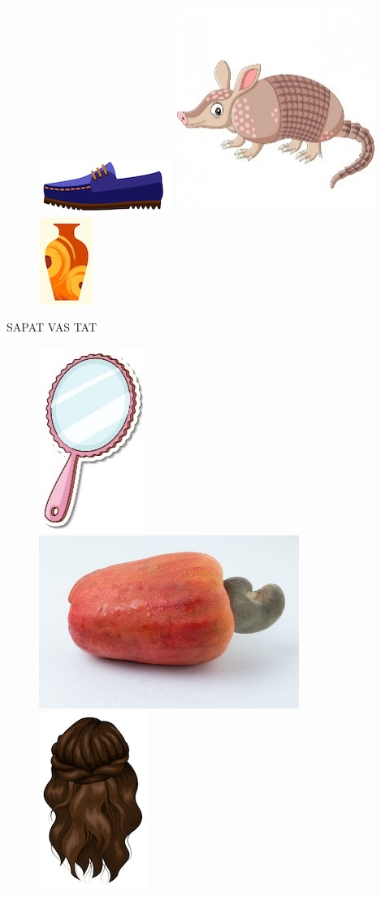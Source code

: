 \begin{figure}[htpb!]
\includegraphics[width=.3\textwidth]{media/image34.jpeg}
\includegraphics[width=.3\textwidth]{media/image35.jpeg}
\includegraphics[width=.2\textwidth]{media/image36.jpeg}
\end{figure}

SAPAT  \hspace{3cm} VAS  \hspace{2cm} TAT 

\begin{figure}[htpb!]
\includegraphics[width=.2\textwidth]{media/image37.jpeg}
\includegraphics[width=.3\textwidth]{media/image38.jpeg}
\includegraphics[width=.2\textwidth]{media/image39.jpeg}
\end{figure}

